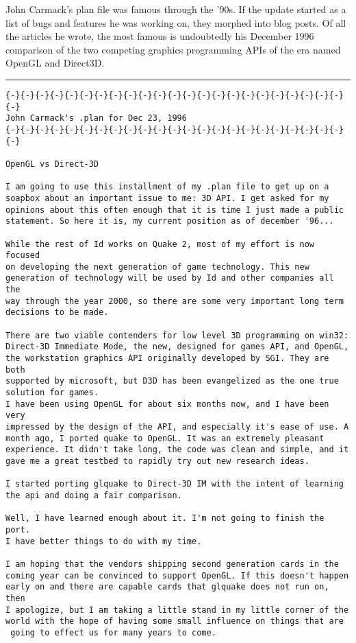 John Carmack's plan file was famous through the '90s. If the update started as a list of bugs and features he was working
on, they morphed into blog posts. Of all the articles he wrote, the most famous is undoubtedly his December 1996 comparison of the two competing graphics programming APIs of the era named OpenGL and Direct3D.\\
\par
\vspace{10pt}
\label{openglvsdirectd}
\hrule  \par
\begin{verbatim}
{-}{-}{-}{-}{-}{-}{-}{-}{-}{-}{-}{-}{-}{-}{-}{-}{-}{-}{-}{-}{-}{-}{-}{-}
John Carmack's .plan for Dec 23, 1996
{-}{-}{-}{-}{-}{-}{-}{-}{-}{-}{-}{-}{-}{-}{-}{-}{-}{-}{-}{-}{-}{-}{-}{-}

OpenGL vs Direct-3D

I am going to use this installment of my .plan file to get up on a 
soapbox about an important issue to me: 3D API. I get asked for my 
opinions about this often enough that it is time I just made a public 
statement. So here it is, my current position as of december '96... 

While the rest of Id works on Quake 2, most of my effort is now focused 
on developing the next generation of game technology. This new 
generation of technology will be used by Id and other companies all the 
way through the year 2000, so there are some very important long term 
decisions to be made.

There are two viable contenders for low level 3D programming on win32: 
Direct-3D Immediate Mode, the new, designed for games API, and OpenGL, 
the workstation graphics API originally developed by SGI. They are both 
supported by microsoft, but D3D has been evangelized as the one true 
solution for games. 
I have been using OpenGL for about six months now, and I have been very 
impressed by the design of the API, and especially it's ease of use. A 
month ago, I ported quake to OpenGL. It was an extremely pleasant 
experience. It didn't take long, the code was clean and simple, and it 
gave me a great testbed to rapidly try out new research ideas. 

I started porting glquake to Direct-3D IM with the intent of learning 
the api and doing a fair comparison. 

Well, I have learned enough about it. I'm not going to finish the port. 
I have better things to do with my time. 

I am hoping that the vendors shipping second generation cards in the 
coming year can be convinced to support OpenGL. If this doesn't happen 
early on and there are capable cards that glquake does not run on, then 
I apologize, but I am taking a little stand in my little corner of the 
world with the hope of having some small influence on things that are 
 going to effect us for many years to come. 


\end{verbatim}
